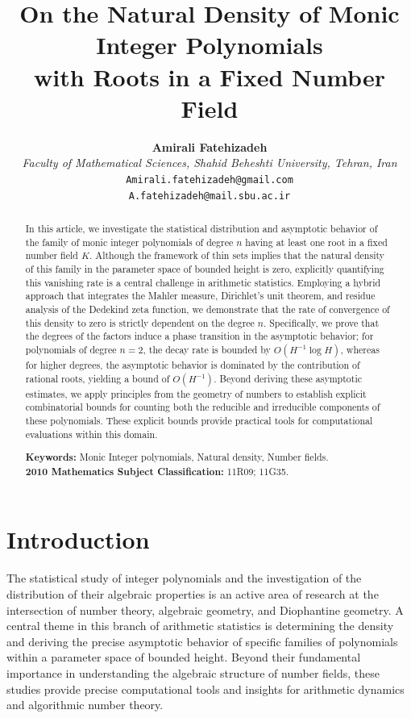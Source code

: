 \documentclass[11pt,a4paper]{article}
\title{\textbf{On the Natural Density of Monic Integer Polynomials \\ with Roots in a Fixed Number Field}}
\author{
    \textbf{Amirali Fatehizadeh} \\[0.2cm]
    \small \textit{Faculty of Mathematical Sciences, Shahid Beheshti University, Tehran, Iran} \\
    \small \texttt{Amirali.fatehizadeh@gmail.com} \\
    \small \texttt{A.fatehizadeh@mail.sbu.ac.ir}
}
\date{}
\begin{document}
\maketitle

\begin{abstract}
In this article, we investigate the statistical distribution and asymptotic behavior of the family of monic integer polynomials of degree $n$ having at least one root in a fixed number field $K$. Although the framework of thin sets implies that the natural density of this family in the parameter space of bounded height is zero, explicitly quantifying this vanishing rate is a central challenge in arithmetic statistics. Employing a hybrid approach that integrates the Mahler measure, Dirichlet's unit theorem, and residue analysis of the Dedekind zeta function, we demonstrate that the rate of convergence of this density to zero is strictly dependent on the degree $n$. Specifically, we prove that the degrees of the factors induce a phase transition in the asymptotic behavior; for polynomials of degree $n=2$, the decay rate is bounded by $O(H^{-1} \log H)$, whereas for higher degrees, the asymptotic behavior is dominated by the contribution of rational roots, yielding a bound of $O(H^{-1})$. Beyond deriving these asymptotic estimates, we apply principles from the geometry of numbers to establish explicit combinatorial bounds for counting both the reducible and irreducible components of these polynomials. These explicit bounds provide practical tools for computational evaluations within this domain.

\vspace{0.5cm}
\noindent \textbf{Keywords:} Monic Integer polynomials, Natural density, Number fields. \\
\noindent \textbf{2010 Mathematics Subject Classification:} 11R09; 11G35.
\end{abstract}

\section{Introduction}
The statistical study of integer polynomials and the investigation of the distribution of their algebraic properties is an active area of research at the intersection of number theory, algebraic geometry, and Diophantine geometry. A central theme in this branch of arithmetic statistics is determining the density and deriving the precise asymptotic behavior of specific families of polynomials within a parameter space of bounded height. Beyond their fundamental importance in understanding the algebraic structure of number fields, these studies provide precise computational tools and insights for arithmetic dynamics and algorithmic number theory.
\end{document}

